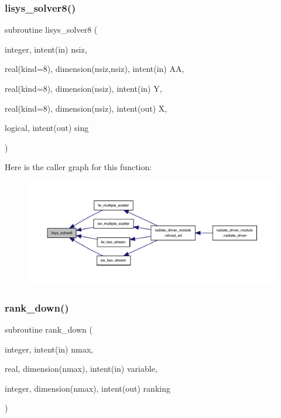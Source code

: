 \mbox{\label{numutils_8f90_a4a474fb2edbafe34d84319dd1ffe33b3}} 
\subsubsection{\texorpdfstring{lisys\+\_\+solver8()}{lisys\_solver8()}}
{\footnotesize\ttfamily subroutine lisys\+\_\+solver8 (\begin{DoxyParamCaption}\item[{integer, intent(in)}]{nsiz,  }\item[{real(kind=8), dimension(nsiz,nsiz), intent(in)}]{AA,  }\item[{real(kind=8), dimension(nsiz), intent(in)}]{Y,  }\item[{real(kind=8), dimension(nsiz), intent(out)}]{X,  }\item[{logical, intent(out)}]{sing }\end{DoxyParamCaption})}

Here is the caller graph for this function\+:
\nopagebreak
\begin{figure}[H]
\begin{center}
\leavevmode
\includegraphics[width=350pt]{numutils_8f90_a4a474fb2edbafe34d84319dd1ffe33b3_icgraph}
\end{center}
\end{figure}
\mbox{\label{numutils_8f90_ad368a70da00278adffefa8d34a5f87c6}} 
\subsubsection{\texorpdfstring{rank\+\_\+down()}{rank\_down()}}
{\footnotesize\ttfamily subroutine rank\+\_\+down (\begin{DoxyParamCaption}\item[{integer, intent(in)}]{nmax,  }\item[{real, dimension(nmax), intent(in)}]{variable,  }\item[{integer, dimension(nmax), intent(out)}]{ranking }\end{DoxyParamCaption})}

